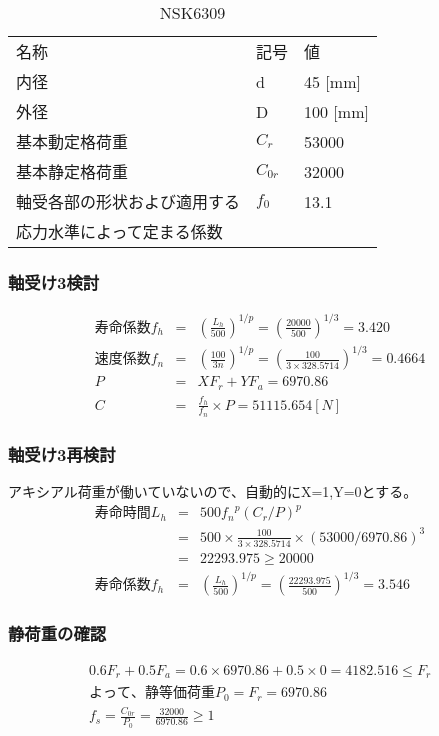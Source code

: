 \begin{table}[htb]
\begin{center}
  \caption{NSK6309}
  \begin{tabular}{lll} \hline
名称&記号&値\\
内径& d &45 [mm]\\
外径& D &100 [mm]\\
基本動定格荷重&$C_{r}$&53000\\
基本静定格荷重&$C_{0r}$&32000\\
軸受各部の形状および適用する&$f_0$&13.1\\
応力水準によって定まる係数&&\\
\hline
  \end{tabular}
\end{center}
\end{table}

\subsubsection{軸受け3検討}
\begin{eqnarray}
寿命係数f_h &=& \left( \frac{L_h}{500} \right)^{1/p} = \left( \frac{20000}{500} \right)^{1/3} = 3.420\\
速度係数f_n &=& \left( \frac{100}{3n} \right)^{1/p} = \left( \frac{100}{3 \times 328.5714} \right)^{1/3} = 0.4664\\
P &=& XF_r+YF_a = 6970.86\\
C &=& \frac{f_h}{f_n} \times P = 51115.654[N]
\end{eqnarray}

\subsubsection{軸受け3再検討}
アキシアル荷重が働いていないので、自動的にX=1,Y=0とする。
\begin{eqnarray}
寿命時間L_h &=& 500{f_n}^p(C_r/P)^p\\
           &=& 500 \times \frac{100}{3 \times 328.5714} \times (53000/6970.86)^3\\
           &=& 22293.975 \geq 20000\\
寿命係数f_h &=& \left( \frac{L_h}{500} \right)^{1/p} = \left( \frac{22293.975}{500} \right)^{1/3} = 3.546
\end{eqnarray}

\subsubsection{静荷重の確認}
\begin{eqnarray}
0.6F_r+0.5F_a=0.6 \times 6970.86 + 0.5 \times 0 = 4182.516 \leq F_r\\
よって、静等価荷重P_0 = F_r = 6970.86\\
f_s = \frac{C_{0r}}{P_0} = \frac{32000}{6970.86} \geq 1
\end{eqnarray}







